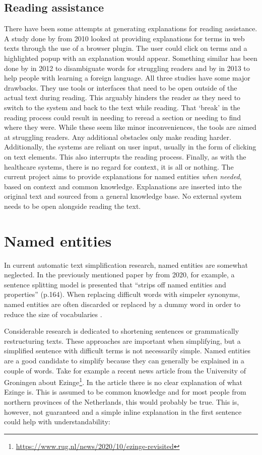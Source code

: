 \documentclass[
10pt, %
a4paper, %
oneside, %
headinclude,footinclude, %
] {book}%
\begin{document}
\subsection{Reading assistance}
There have been some attempts at generating explanations for reading assistance.
A study done by \citeauthor{watanabe2010} from 2010 looked at providing explanations for terms in web texts through the use of a browser plugin.
The user could click on terms and a highlighted popup with an explanation would appear.
Something similar has been done by \citeauthor{eom2012} in 2012 to disambiguate words for struggling readers and by \citeauthor{azab2013} in 2013 to help people with learning a foreign language.
All three studies have some major drawbacks.
They use tools or interfaces that need to be open outside of the actual text during reading.
This arguably hinders the reader as they need to switch to the system and back to the text while reading.
That `break' in the reading process could result in needing to reread a section or needing to find where they were.
While these seem like minor inconveniences, the tools are aimed at struggling readers.
Any additional obstacles only make reading harder.
Additionally, the systems are reliant on user input, usually in the form of clicking on text elements.
This also interrupts the reading process.
Finally, as with the healthcare systems, there is no regard for context, it is all or nothing.
The current project aims to provide explanations for named entities \textit{when needed}, based on context and common knowledge.
Explanations are inserted into the original text and sourced from a general knowledge base.
No external system needs to be open alongside reading the text.

\section{Named entities}
In current automatic text simplification research, named entities are somewhat neglected.
In the previously mentioned paper by \citeauthor{alva2020} from 2020, for example, a sentence splitting model is presented that ``strips off named entities and properties'' (p.164).
When replacing difficult words with simpeler synonyms, named entities are often discarded or replaced by a dummy word in order to reduce the size of vocabularies \citep{nisioi2017,alva2020}.

Considerable research is dedicated to shortening sentences or grammatically restructuring texts.
These approaches are important when simplifying, but a simplified sentence with difficult terms is not necessarily simple.
Named entities are a good candidate to simplify because they can generally be explained in a couple of words.
Take for example a recent news article from the University of Groningen about Ezinge\footnote{\url{https://www.rug.nl/news/2020/10/ezinge-revisited}}.
In the article there is no clear explanation of what Ezinge is.
This is assumed to be common knowledge and for most people from northern provinces of the Netherlands, this would probably be true.
This is, however, not guaranteed and a simple inline explanation in the first sentence could help with understandability:
\end{document}
